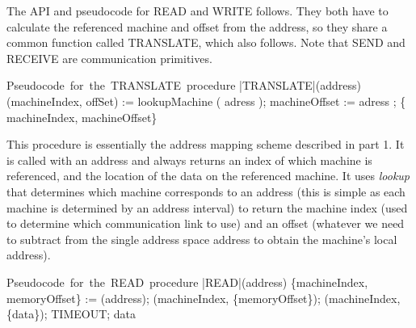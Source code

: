 \documentclass[11pt]{article}
\begin{document}

The API and pseudocode for READ and WRITE follows. They both have to calculate the referenced machine and offset from the address, so they share a common function called TRANSLATE, which also follows. Note that SEND and RECEIVE are communication primitives.



\begin{program}
\mbox{Pseudocode for the TRANSLATE procedure}
       \PROC |TRANSLATE|(address) \BODY
                 (machineIndex, offSet) := lookupMachine ( adress );
                 machineOffset := adress \; \text{-} \; ;
                  \; \{ machineIndex, machineOffset\} \ENDPROC
\end{program}

This procedure is essentially the address mapping scheme described in part 1. It is called with an address and always returns an index of which machine is referenced, and the location of the data on the referenced machine. It uses \emph{lookup} that determines which machine corresponds to an address (this is simple as each machine is determined by an address interval) to return
the machine index (used to determine which communication link to use) and an offset (whatever we need to subtract from the single address space address to obtain the machine's local address).

\begin{program}
\mbox{Pseudocode for the READ procedure}
        \PROC |READ|(address) \BODY
               \{machineIndex, memoryOffset\} :=  (address);
                (machineIndex, \{memoryOffset\});
                \;  (machineIndex, \{data\});
                \; TIMEOUT;
                \; data \ENDPROC
\end{program}
\end{document}
